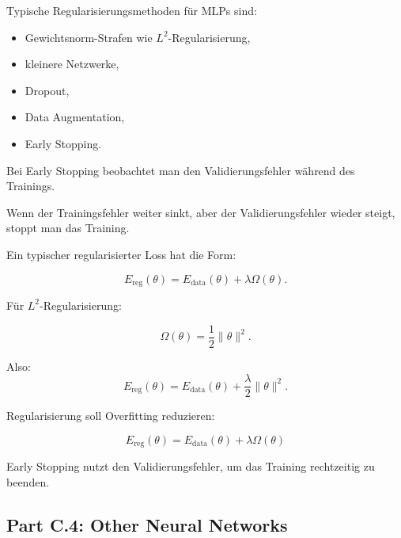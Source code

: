 \documentclass[11pt,a4paper]{scrartcl}
\begin{document}
\begin{solutionbox}
    Typische Regularisierungsmethoden für MLPs sind:

    \begin{itemize}
        \item Gewichtsnorm-Strafen wie \(L^2\)-Regularisierung,
        \item kleinere Netzwerke,
        \item Dropout,
        \item Data Augmentation,
        \item Early Stopping.
    \end{itemize}

    Bei Early Stopping beobachtet man den Validierungsfehler während des
    Trainings.

    Wenn der Trainingsfehler weiter sinkt, aber der Validierungsfehler wieder
    steigt, stoppt man das Training.
\end{solutionbox}

\begin{calculationbox}
    Ein typischer regularisierter Loss hat die Form:

    \[
        E_{\mathrm{reg}}(\theta)
        =
        E_{\mathrm{data}}(\theta)
        +
        \lambda \Omega(\theta).
    \]

    Für \(L^2\)-Regularisierung:

    \[
        \Omega(\theta)
        =
        \frac{1}{2}
        \|\theta\|^2.
    \]

    Also:
    \[
        E_{\mathrm{reg}}(\theta)
        =
        E_{\mathrm{data}}(\theta)
        +
        \frac{\lambda}{2}
        \|\theta\|^2.
    \]
\end{calculationbox}

\begin{answerbox}
    Regularisierung soll Overfitting reduzieren:

    \[
        \boxed{
            E_{\mathrm{reg}}(\theta)
            =
            E_{\mathrm{data}}(\theta)
            +
            \lambda \Omega(\theta)
        }
    \]

    Early Stopping nutzt den Validierungsfehler, um das Training rechtzeitig zu
    beenden.
\end{answerbox}

\subsection{Part C.4: Other Neural Networks}
\end{document}
